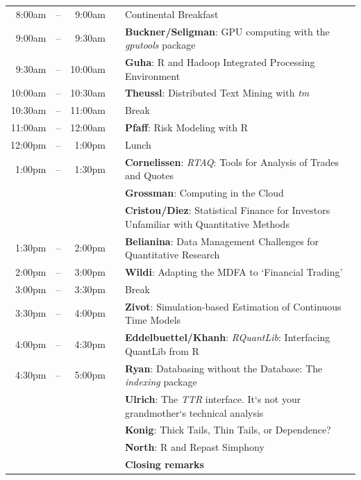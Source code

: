 \documentclass[11pt]{article}
\newcommand{\mylinecolor}[1]{\color{#1}\vspace{-8pt}}  %
\begin{document}
\begin{tabular}{rlrlp{5in}}
  8:00am  & -- &  9:00am &   & \small{\mylinecolor{Breaks} Continental Breakfast}  \\
  9:00am  & -- &  9:30am &   & \textbf{\color{Talk} Buckner/Seligman}: \small{GPU computing with the \emph{gputools} package} \\
  9:30am  & -- & 10:00am &   & \textbf{\color{Talk} Guha}: \small{R and Hadoop Integrated Processing Environment} \\
  10:00am & -- & 10:30am &   & \textbf{\color{Talk} Theussl}: \small{Distributed Text Mining with \emph{tm}} \\
  10:30am & -- & 11:00am &   & \small{\mylinecolor{Breaks}  Break}  \\
  11:00am & -- & 12:00am &   & \textbf{\color{KeynoteTalk} Pfaff}: \small{Risk Modeling with R} \\
  12:00pm & -- &  1:00pm &   & \small{\mylinecolor{Breaks}  Lunch}  \\
   1:00pm & -- &  1:30pm &   & \textbf{\color{LightningTalk} Cornelissen}: \small{\emph{RTAQ}: Tools for Analysis of Trades and Quotes} \\
          &    &         &   & \textbf{\color{LightningTalk} Grossman}: \small{Computing in the Cloud} \\
          &    &         &   & \textbf{\color{LightningTalk} Cristou/Diez}: \small{Statistical Finance for Investors Unfamiliar with Quantitative Methods} \\
   1:30pm & -- & 2:00pm  &   & \textbf{\color{Talk} Belianina}: \small{Data Management Challenges for Quantitative Research} \\
   2:00pm & -- & 3:00pm  &   & \textbf{\color{KeynoteTalk} Wildi}: \small{Adapting the MDFA to `Financial Trading'} \\
   3:00pm & -- & 3:30pm  &   & \small{\mylinecolor{Breaks} Break} \\
   3:30pm & -- & 4:00pm  &   & \textbf{\color{Talk} Zivot}: \small{Simulation-based Estimation of Continuous Time Models} \\
   4:00pm & -- & 4:30pm  &   & \textbf{\color{Talk} Eddelbuettel/Khanh}: \small{\emph{RQuantLib}: Interfacing QuantLib from R} \\
   4:30pm & -- & 5:00pm  &   & \textbf{\color{LightningTalk} Ryan}: \small{Databasing without the Database: The \emph{indexing} package} \\
          &    &         &   & \textbf{\color{LightningTalk} Ulrich}: \small{The \emph{TTR} interface.  It`s not your grandmother`s technical analysis} \\
          &    &         &   & \textbf{\color{LightningTalk} Konig}: \small{Thick Tails, Thin Tails, or Dependence?} \\
          &    &         &   & \textbf{\color{LightningTalk} North}: \small{R and Repast Simphony} \\
          &    &         &   & \textbf{\color{Breaks} Closing remarks} \\
\end{tabular}
\end{document}
